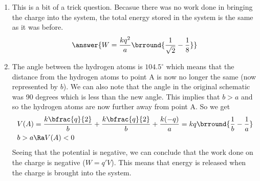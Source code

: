 {\begin{enumerate}
    We get that the charge at point A is the same as that at infinity. Therefore, no work is required to bring the charge from infinity to point A.
    \item This is a bit of a trick question. Becasue there was no work done in bringing the charge into the system, the total energy stored in the system is the same as it was before.
    \[\answer{W=\frac{kq^2}{a}\brround{\frac{1}{\sqrt{2}}-\frac{1}{8}}}\]
    \item The angle between the hydrogen atoms is $104.5^\circ$ which means that the distance from the hydrogen atoms to point A is now no longer the same (now represented by $b$). We can also note that the angle in the original schematic was 90 degrees which is less than the new angle. This implies that $b>a$ and so the hydrogen atoms are now further away from point A. So we get
    \begin{align*}
        &V(A)=\frac{k\bfrac{q}{2}}{b}+\frac{k\bfrac{q}{2}}{b}+\frac{k(-q)}{a}=kq\brround{\frac{1}{b}-\frac{1}{a}}\\
        &b>a\Ra V(A)<0
    \end{align*}
    Seeing that the potential is negative, we can conclude that the work done on the charge is negative ($W=q'V$). This means that energy is released when the charge is brought into the system.\\
\end{enumerate}
}{}